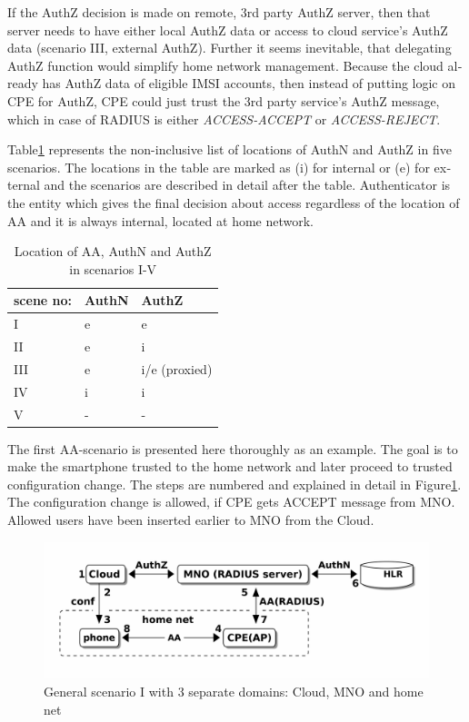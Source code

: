 \documentclass[12pt,a4paper,english]{tutthesis}
\begin{document}
\begin{otherlanguage}{english}
If the AuthZ decision is made on remote, 3rd party AuthZ server, 
then that server needs to have either local AuthZ data or access to 
cloud service's AuthZ data (scenario III, external AuthZ).
Further it seems inevitable, that delegating AuthZ function 
would simplify home network management. Because the cloud
already 
has AuthZ data of eligible IMSI accounts,
then instead of putting logic on CPE for AuthZ, CPE
could just trust the 3rd party service's AuthZ message, which in case
of RADIUS is either \emph{ACCESS-ACCEPT} or \emph{ACCESS-REJECT}.



Table\ref{table-scenarios} represents the non-inclusive list of locations of
AuthN and AuthZ in five scenarios. The locations in the table are marked as (i)
for internal or (e) for external and the scenarios are
described in detail after the table. Authenticator is the entity which
gives the final decision about access regardless of the location of AA
and it is always internal, located at home network.

\begin{table}[htb]
\caption{\label{table-scenarios}Location of AA, AuthN and AuthZ in scenarios I-V}
\centering
\begin{tabular}{lll}
scene no: & AuthN & AuthZ\\
\hline
I & e & e\\
II & e & i\\
III & e & i/e (proxied)\\
IV & i & i\\
V & - & -\\
\end{tabular}
\end{table}
\label{scenario-i}
The first AA-scenario is presented here thoroughly as an example.
The goal is to make the smartphone trusted to the home network and
later proceed to trusted configuration change.
The steps are numbered and explained in detail in Figure\ref{fig:scenario-I}.
The configuration change is allowed, if CPE gets ACCEPT message from
MNO. Allowed users have been inserted earlier to MNO from the Cloud.


\begin{figure}[htb]
\centering
\includegraphics[width=.9\linewidth]{scenI.png}
\caption{\label{fig:scenario-I}General scenario I with 3 separate domains: Cloud, MNO and home net}
\end{figure}


\end{otherlanguage}
\end{document}
